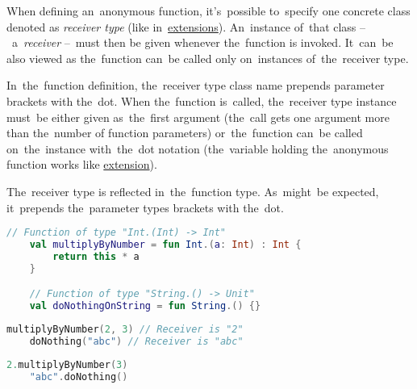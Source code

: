 \label{kotlinanonymousreceivertype}
When defining an~anonymous function, it's~possible to~specify one concrete class denoted as \textit{receiver type} (like in~\hyperref[kotlinextensions]{extensions}).
An~instance of~that class --~a~\textit{receiver} --~must then be given whenever the~function is invoked.
It~can~be also viewed as the~function can~be called only on~instances of~the~receiver type.

In~the~function definition, the~receiver type class name prepends parameter brackets with the~dot.
When the~function is~called, the~receiver type instance must~be either given as~the~first argument (the~call gets one argument more than the~number of function parameters) or~the~function can~be called on~the~instance with~the~dot notation (the~variable holding the~anonymous function works like \hyperref[kotlinextensions]{extension}).

The~receiver type is reflected in~the~function type.
As~might~be expected, it~prepends the~parameter types brackets with the~dot.

\example
\begin{lstlisting}[language=Kotlin]
    // Function of type "Int.(Int) -> Int"
    val multiplyByNumber = fun Int.(a: Int) : Int {
        return this * a
    }

    // Function of type "String.() -> Unit"
    val doNothingOnString = fun String.() {}
\end{lstlisting}
\begin{lstlisting}[language=Kotlin, title={Usage with passing receivers as arguments}]
    multiplyByNumber(2, 3) // Receiver is "2"
    doNothing("abc") // Receiver is "abc"
\end{lstlisting}
\begin{lstlisting}[language=Kotlin, title={Equivalent with calling on receivers}]
    2.multiplyByNumber(3)
    "abc".doNothing()
\end{lstlisting}

